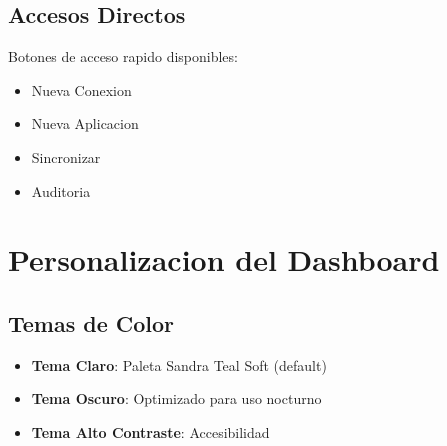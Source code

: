 \subsection{Accesos Directos}

Botones de acceso rapido disponibles:

\begin{itemize}[leftmargin=*]
    \item {\color{sandraGreen}} Nueva Conexion
    \item {\color{sandraGreen}} Nueva Aplicacion
    \item {\color{sandraGreen}} Sincronizar
    \item {\color{sandraGreen}} Auditoria
\end{itemize}

\section{Personalizacion del Dashboard}

\subsection{Temas de Color}

\begin{itemize}[leftmargin=*]
    \item \textbf{Tema Claro}: Paleta Sandra Teal Soft (default)
    \item \textbf{Tema Oscuro}: Optimizado para uso nocturno
    \item \textbf{Tema Alto Contraste}: Accesibilidad
\end{itemize}
